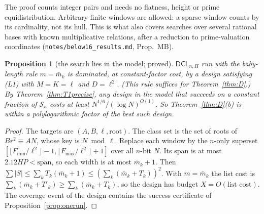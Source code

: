 \documentclass[11pt]{amsart}
\newtheorem{proposition}[theorem]{Proposition}
\theoremstyle{definition}
\newcommand{\Sn}{\mathcal{S}_n}
\newcommand{\mbar}{\bar m_k}
\newcommand{\spanbar}{\overline{\mathrm{span}}}
\newcommand{\DCL}{\textsf{DCL}}
\begin{document}
The proof counts integer pairs and needs no flatness, height or prime equidistribution.
Arbitrary finite windows are allowed: a sparse window counts by its cardinality, not its hull.
This is what also covers searches over several rational bases with known multiplicative
relations, after a reduction to prime-valuation coordinates (\texttt{notes/below16\_results.md},
Prop.~MB).

\begin{proposition}[the search lies in the model; proved]\label{prop:Dinmodel}
$\DCL_{n,H}$ run with the baby-length rule $m=\mbar$ is dominated, at constant-factor cost, by a
design satisfying (L1) with $M=K=\ell$ and $D=\ell^2$. (This rule suffices for
Theorem~\ref{thm:D}.) By Theorem~\ref{thm:T1precise}, any design in the model that succeeds on a
constant fraction of $\Sn$ costs at least $N^{1/6}/(\log N)^{O(1)}$. So
Theorem~\ref{thm:D}(b) is within a polylogarithmic factor of the best such design.
\end{proposition}
\begin{proof}
The targets are $(A,B,\ell,\text{root})$. The class set is the set of roots of $Br^2\equiv AN$,
whose key is $N\bmod\ell$. Replace each window by the $n$-only superset
$[\lfloor F_{\min}/\ell^2\rfloor-1,\lfloor F_{\max}/\ell^2\rfloor+1]$ over all $n$-bit $N$. Its
span is at most $2.12HP<\spanbar$, so each width is at most $\mbar+1$. Then
$\sum|S|\le\sum_kT_k(\mbar+1)\le(\sum_k(\mbar+T_k))^2$. With $m=\mbar$ the list cost is
$\sum_k(\mbar+T'_k)\ge\sum_k(\mbar+T_k)$, so the design has budget $X=O(\text{list cost})$.
The coverage event of the design contains the success certificate of
Proposition~\ref{prop:onerun}.
\end{proof}
\end{document}
